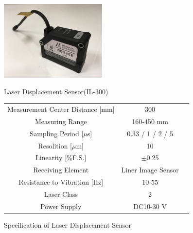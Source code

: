 \documentclass[a4paper,12pt]{article_vdlab_sotsuron}
\begin{document}
\vspace*{10mm}
\begin{figure}[htp]
  \begin{minipage}{0.3\textwidth}
    \begin{center}
      \includegraphics[height=40mm]{figure/il_300.eps}
      \vspace*{3mm}
      \caption{Laser Displacement Sensor(IL-300)}
      \label{fig:il_300}
    \end{center}
  \end{minipage}
  \begin{minipage}{0.7\textwidth}
      \begin{center}
	\makeatletter
	\def\@captype{table}
	\makeatother
	\caption{Specification of Laser Displacement Sensor}
	\label{tab:il_300}
	\begin{tabular}{ccc}\hline
	  Measurement Center Distance [mm] & 300\\
	  Measuring Range & 160-450 mm\\
	  Sampling Period [$\mu$s]& 0.33 / 1 / 2 / 5\\
	  Resolition [$\mu$m] & 10\\
	  Linearity [\%F.S.] & $\pm$0.25\\
	  Receiving Element & Liner Image Sensor\\
	  Resistance to Vibration [Hz] & 10-55\\
	  Laser Class & 2\\
	  Power Supply & DC10-30 V\\\hline
	  \end{tabular}
	\end{center}
  \end{minipage}
\end{figure}
\end{document}
